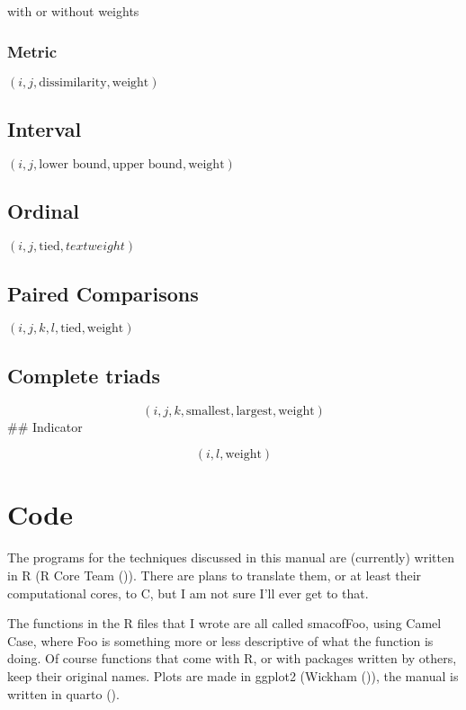 \documentclass[
  12pt,
  letterpaper,
  DIV=11,
  numbers=noendperiod]{scrartcl}
\newcommand{\sectionbreak}{\clearpage}
\theoremstyle{plain}
\theoremstyle{remark}
\begin{document}
with or without weights

\subsubsection{Metric}\label{metric}

\((i, j, \text{dissimilarity}, \text{weight})\)

\subsection{Interval}\label{interval}

\((i, j, \text{lower bound}, \text{upper bound}, \text{weight})\)

\subsection{Ordinal}\label{ordinal}

\((i, j, \text{tied}, text{weight})\)

\subsection{Paired Comparisons}\label{paired-comparisons}

\((i, j, k, l, \text{tied}, \text{weight})\)

\subsection{Complete triads}\label{complete-triads}

\[(i, j, k, \text{smallest}, \text{largest}, \text{weight})\] \#\#
Indicator

\[(i, l, \text{weight})\]

\sectionbreak

\section{Code}\label{code}

The programs for the techniques discussed in this manual are (currently)
written in R (R Core Team ()). There
are plans to translate them, or at least their computational cores, to
C, but I am not sure I'll ever get to that.

The functions in the R files that I wrote are all called smacofFoo,
using Camel Case, where Foo is something more or less descriptive of
what the function is doing. Of course functions that come with R, or
with packages written by others, keep their original names. Plots are
made in ggplot2 (Wickham ()), the manual
is written in quarto ().
\end{document}
